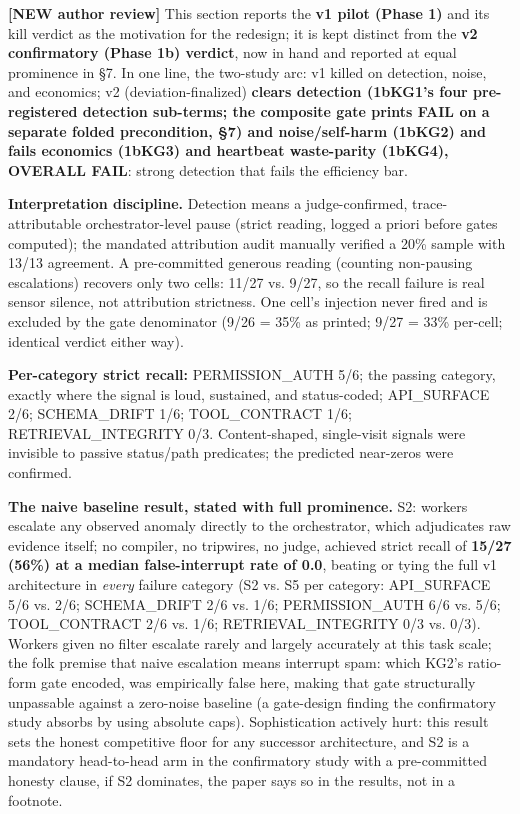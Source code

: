 \documentclass[acmsmall,screen,review,anonymous]{acmart}
\renewenvironment{leftbar}{%
  \def\FrameCommand{\hspace{2pt}{\color{lbcol}\vrule width 1.5pt}\hspace{8pt}}%
  \MakeFramed{\advance\hsize-\width \FrameRestore}\small}%
  {\endMakeFramed}
\begin{document}
\begin{leftbar}
\textbf{[NEW \textperiodcentered{} author review]} This section reports the \textbf{v1 pilot (Phase 1)} and its kill verdict as the motivation for the redesign; it is kept distinct from the \textbf{v2 confirmatory (Phase 1b) verdict}, now in hand and reported at equal prominence in \S7. In one line, the two-study arc: v1 killed on detection, noise, and economics; v2 (deviation-finalized) \textbf{clears detection (1bKG1's four pre-registered detection sub-terms; the composite gate prints FAIL on a separate folded precondition, \S7) and noise/self-harm (1bKG2) and fails economics (1bKG3) and heartbeat waste-parity (1bKG4), OVERALL FAIL}: strong detection that fails the efficiency bar.

\end{leftbar}
\textbf{Interpretation discipline.} Detection means a judge-confirmed, trace-attributable orchestrator-level pause (strict reading, logged a priori before gates computed); the mandated attribution audit manually verified a 20\% sample with 13/13 agreement. A pre-committed generous reading (counting non-pausing escalations) recovers only two cells: 11/27 vs. 9/27, so the recall failure is real sensor silence, not attribution strictness. One cell's injection never fired and is excluded by the gate denominator (9/26 = 35\% as printed; 9/27 = 33\% per-cell; identical verdict either way).

\textbf{Per-category strict recall:} PERMISSION\_AUTH 5/6; the passing category, exactly where the signal is loud, sustained, and status-coded; API\_SURFACE 2/6; SCHEMA\_DRIFT 1/6; TOOL\_CONTRACT 1/6; RETRIEVAL\_INTEGRITY 0/3. Content-shaped, single-visit signals were invisible to passive status/path predicates; the predicted near-zeros were confirmed.

\textbf{The naive baseline result, stated with full prominence.} S2: workers escalate any observed anomaly directly to the orchestrator, which adjudicates raw evidence itself; no compiler, no tripwires, no judge, achieved strict recall of \textbf{15/27 (56\%) at a median false-interrupt rate of 0.0}, beating or tying the full v1 architecture in \emph{every} failure category (S2 vs. S5 per category: API\_SURFACE 5/6 vs. 2/6; SCHEMA\_DRIFT 2/6 vs. 1/6; PERMISSION\_AUTH 6/6 vs. 5/6; TOOL\_CONTRACT 2/6 vs. 1/6; RETRIEVAL\_INTEGRITY 0/3 vs. 0/3). Workers given no filter escalate rarely and largely accurately at this task scale; the folk premise that naive escalation means interrupt spam: which KG2's ratio-form gate encoded, was empirically false here, making that gate structurally unpassable against a zero-noise baseline (a gate-design finding the confirmatory study absorbs by using absolute caps). Sophistication actively hurt: this result sets the honest competitive floor for any successor architecture, and S2 is a mandatory head-to-head arm in the confirmatory study with a pre-committed honesty clause, if S2 dominates, the paper says so in the results, not in a footnote.
\end{document}
